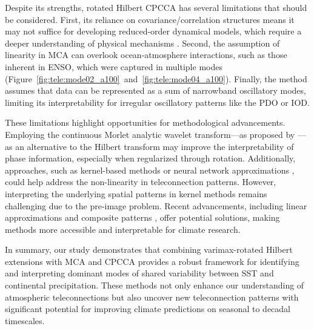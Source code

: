 Despite its strengths, rotated Hilbert CPCCA has several limitations that should be considered. First, its reliance on covariance/correlation structures means it may not suffice for developing reduced-order dynamical models, which require a deeper understanding of physical mechanisms \cite[e.g.][]{farrell_accurate_2001}. Second, the assumption of linearity in MCA can overlook  ocean-atmosphere interactions, such as those inherent in ENSO, which were captured in multiple modes (Figure~\ref{fig:tele:mode02_a100}~and~\ref{fig:tele:mode04_a100}). Finally, the method assumes that data can be represented as a sum of narrowband oscillatory modes, limiting its interpretability for irregular oscillatory patterns like the PDO or IOD.

These limitations highlight opportunities for methodological advancements. Employing the continuous Morlet analytic wavelet transform---as proposed by \citet{guilloteau_rotated_2020}---as an alternative to the Hilbert transform may improve the interpretability of phase information, especially when regularized through rotation. Additionally,  approaches, such as kernel-based methods \cite{akaho_kernel_2007} or neural network approximations \cite{asoh_approximation_1994,hsieh_nonlinear_2000}, could help address the non-linearity in teleconnection patterns. However, interpreting the underlying spatial patterns in kernel methods remains challenging due to the pre-image problem. Recent advancements, including linear approximations \cite{bueso_nonlinear_2020} and composite patterns \cite{hannachi_bimodality_2019}, offer potential solutions, making  methods more accessible and interpretable for climate research.

In summary, our study demonstrates that combining varimax-rotated Hilbert extensions with MCA and CPCCA provides a robust framework for identifying and interpreting dominant modes of shared variability between SST and continental precipitation. These methods not only enhance our understanding of atmospheric teleconnections but also uncover new teleconnection patterns with significant potential for improving climate predictions on seasonal to decadal timescales.